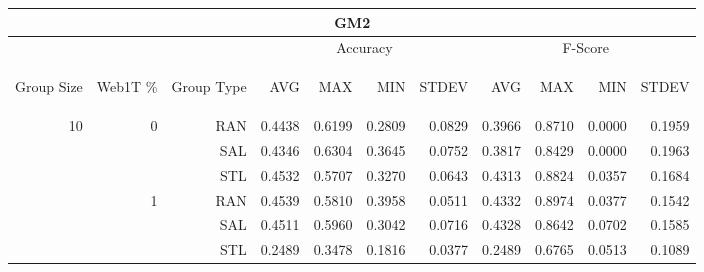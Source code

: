 \begin{center}
\begin{table}[htbp] 
 \begin{center}
\begin{tabular}{ | r | r | r | r | r | r | r | r | r | r | r |}
\hline
\multicolumn{11}{|c|}{GM2}\\
\hline
 & & & \multicolumn{4}{|c|}{Accuracy} & \multicolumn{4}{|c|}{F-Score}\\ \cline{4-11}
\begin{sideways}Group Size\end{sideways} & \begin{sideways}Web1T \%\end{sideways} & \begin{sideways}Group Type\end{sideways} & \begin{sideways}AVG\end{sideways} & \begin{sideways}MAX\end{sideways} & \begin{sideways}MIN\end{sideways} & \begin{sideways}STDEV\end{sideways} & \begin{sideways}AVG\end{sideways} & \begin{sideways}MAX\end{sideways} & \begin{sideways}MIN\end{sideways} & \begin{sideways}STDEV\end{sideways}\\
\hline
\multirow{18}{*}{10}
 & \multirow{3}{*}{0} & RAN & 0.4438 & 0.6199 & 0.2809 & 0.0829 & 0.3966 & 0.8710 & 0.0000 & 0.1959\\ \cline{3-11}
 &   & SAL & 0.4346 & 0.6304 & 0.3645 & 0.0752 & 0.3817 & 0.8429 & 0.0000 & 0.1963\\ \cline{3-11}
 &   & STL & 0.4532 & 0.5707 & 0.3270 & 0.0643 & 0.4313 & 0.8824 & 0.0357 & 0.1684\\ \cline{2-11}
 & \multirow{3}{*}{1} & RAN & 0.4539 & 0.5810 & 0.3958 & 0.0511 & 0.4332 & 0.8974 & 0.0377 & 0.1542\\ \cline{3-11}
 &   & SAL & 0.4511 & 0.5960 & 0.3042 & 0.0716 & 0.4328 & 0.8642 & 0.0702 & 0.1585\\ \cline{3-11}
 &   & STL & 0.2489 & 0.3478 & 0.1816 & 0.0377 & 0.2489 & 0.6765 & 0.0513 & 0.1089\\ \cline{2-11}

\end{tabular}
\end{center}
\end{table}
\end{center}
